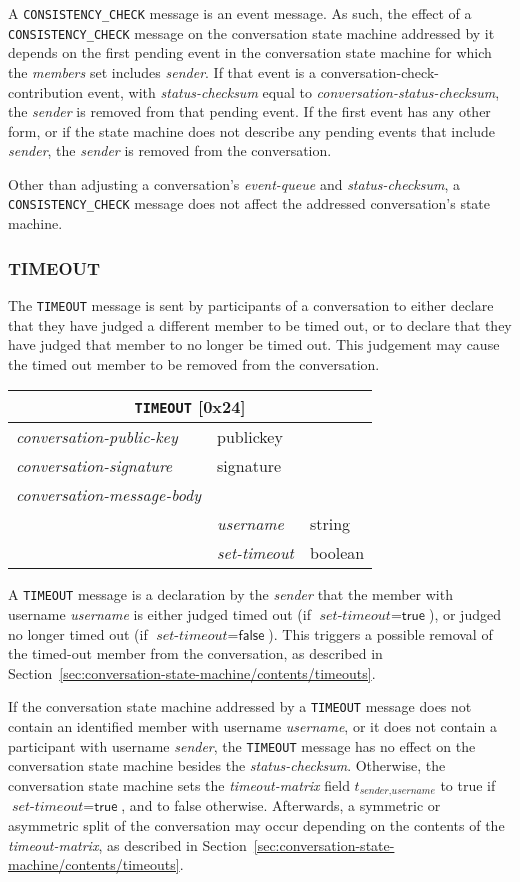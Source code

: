 \documentclass{article}
\def\message#1{\texttt{#1}}
\def\field#1{\textit{#1}}
\def\smfield#1{\textsl{#1}}
\def\type#1{\textsf{#1}}
\newenvironment{conversationmessage}[2]{
\newcommand{\messagefield}[2]{
& \field{##1} & \type{##2} \\
\hline
}
\hspace{2em minus 2em}\begin{tabular}{|l|l|l|}
\hline
\multicolumn{3}{|c|}{\message{#1} [#2]} \\
\hline
\hline
\field{conversation-public-key} & \multicolumn{2}{l|}{\type{publickey}} \\
\hline
\field{conversation-signature} & \multicolumn{2}{l|}{\type{signature}} \\
\hline
\field{conversation-message-body} & \multicolumn{2}{l|}{} \\
\hline
}{
\end{tabular}
}
\begin{document}
A \message{CONSISTENCY\_CHECK} message is an event message.
As such, the effect of a \message{CONSISTENCY\_CHECK} message on the conversation state machine addressed by it depends on the first pending event in the conversation state machine for which the \smfield{members} set includes \field{sender}.
If that event is a \type{conversation-check-contribution} event, with \smfield{status-checksum} equal to \field{conversation-status-checksum}, the \field{sender} is removed from that pending event.
If the first event has any other form, or if the state machine does not describe any pending events that include \field{sender}, the \field{sender} is removed from the conversation.

Other than adjusting a conversation's \smfield{event-queue} and \smfield{status-checksum}, a \message{CONSISTENCY\_CHECK} message does not affect the addressed conversation's state machine.


\subsubsection{TIMEOUT}
\label{sec:messages/timeout}

The \message{TIMEOUT} message is sent by participants of a conversation to either declare that they have judged a different member to be timed out, or to declare that they have judged that member to no longer be timed out.
This judgement may cause the timed out member to be removed from the conversation.

\begin{conversationmessage}{TIMEOUT}{0x24}
\messagefield{username}{string}
\messagefield{set-timeout}{boolean}
\end{conversationmessage}

A \message{TIMEOUT} message is a declaration by the \field{sender} that the member with username \field{username} is either judged timed out (if $\field{set-timeout} = \textsf{true}$), or judged no longer timed out (if $\field{set-timeout} = \textsf{false}$).
This triggers a possible removal of the timed-out member from the conversation, as described in Section~\ref{sec:conversation-state-machine/contents/timeouts}.

If the conversation state machine addressed by a \message{TIMEOUT} message does not contain an identified member with username \field{username}, or it does not contain a participant with username \field{sender}, the \message{TIMEOUT} message has no effect on the conversation state machine besides the \smfield{status-checksum}.
Otherwise, the conversation state machine sets the \smfield{timeout-matrix} field $t_{\field{sender},\field{username}}$ to \textsf{true} if $\field{set-timeout} = \textsf{true}$, and to \textsf{false} otherwise.
Afterwards, a symmetric or asymmetric split of the conversation may occur depending on the contents of the \smfield{timeout-matrix}, as described in Section~\ref{sec:conversation-state-machine/contents/timeouts}.
\end{document}
